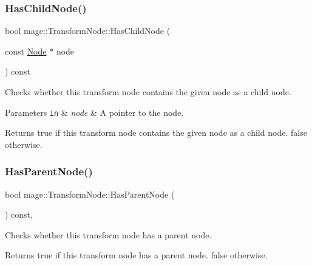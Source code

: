 \subsubsection{\texorpdfstring{Has\+Child\+Node()}{HasChildNode()}}
{\footnotesize\ttfamily bool mage\+::\+Transform\+Node\+::\+Has\+Child\+Node (\begin{DoxyParamCaption}\item[{const \hyperlink{classmage_1_1_node}{Node} $\ast$}]{node }\end{DoxyParamCaption}) const\hspace{0.3cm}{\ttfamily [private]}}

Checks whether this transform node contains the given node as a child node.


\begin{DoxyParams}[1]{Parameters}
\mbox{\tt in}  & {\em node} & A pointer to the node. \\
\hline
\end{DoxyParams}
\begin{DoxyReturn}{Returns}
{\ttfamily true} if this transform node contains the given node as a child node. {\ttfamily false} otherwise. 
\end{DoxyReturn}
\hypertarget{classmage_1_1_transform_node_ad225b5c9f2236f8c6c91dd7a6a9c4ffd}{}\label{classmage_1_1_transform_node_ad225b5c9f2236f8c6c91dd7a6a9c4ffd} 
\subsubsection{\texorpdfstring{Has\+Parent\+Node()}{HasParentNode()}}
{\footnotesize\ttfamily bool mage\+::\+Transform\+Node\+::\+Has\+Parent\+Node (\begin{DoxyParamCaption}{ }\end{DoxyParamCaption}) const\hspace{0.3cm}{\ttfamily [private]}, {\ttfamily [noexcept]}}

Checks whether this transform node has a parent node.

\begin{DoxyReturn}{Returns}
{\ttfamily true} if this transform node has a parent node. {\ttfamily false} otherwise. 
\end{DoxyReturn}
\hypertarget{classmage_1_1_transform_node_afd5f7d7b377b1a85cbe1d64f8f0df49a}{}\label{classmage_1_1_transform_node_afd5f7d7b377b1a85cbe1d64f8f0df49a} 
